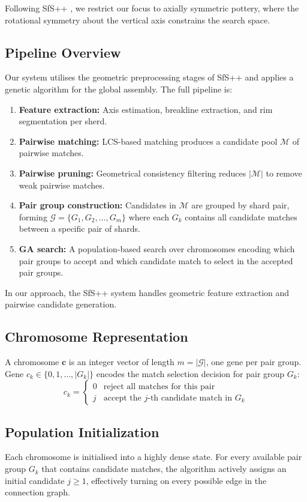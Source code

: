 \documentclass[conference]{IEEEtran}
\begin{document}
Following SfS++ \cite{b2}, we restrict our focus to axially symmetric pottery, where the rotational symmetry about the vertical axis constrains the search space.

\subsection{Pipeline Overview}
Our system utilises the geometric preprocessing stages of SfS++ and applies a genetic algorithm for the global assembly. The full pipeline is:
\begin{enumerate}
\item \textbf{Feature extraction:} Axis estimation, breakline extraction, and rim segmentation per sherd.
\item \textbf{Pairwise matching:} LCS-based matching produces a candidate pool $\mathcal{M}$ of pairwise matches.
\item \textbf{Pairwise pruning:} Geometrical consistency filtering reduces $|\mathcal{M}|$ to remove weak pairwise matches.
\item \textbf{Pair group construction:} Candidates in $\mathcal{M}$ are grouped by shard pair, forming $\mathcal{G} = \{G_1, G_2, \ldots, G_m\}$ where each $G_k$ contains all candidate matches between a specific pair of shards.
\item \textbf{GA search:} A population-based search over chromosomes encoding which pair groups to accept and which candidate match to select in the accepted pair groups.
\end{enumerate}
In our approach, the SfS++ system handles geometric feature extraction and pairwise candidate generation.

\subsection{Chromosome Representation}
A chromosome $\mathbf{c}$ is an integer vector of length $m = |\mathcal{G}|$, one gene per pair group. Gene $c_k \in \{0, 1, \ldots, |G_k|\}$ encodes the match selection decision for pair group $G_k$:
\begin{equation}
c_k =
\begin{cases}
0 & \text{reject all matches for this pair} \\
j & \text{accept the } j\text{-th candidate match in } G_k
\end{cases}
\end{equation}

\subsection{Population Initialization}
Each chromosome is initialised into a highly dense state. For every available pair group $G_k$ that contains candidate matches, the algorithm actively assigns an initial candidate $j \ge 1$, effectively turning on every possible edge in the connection graph.
\end{document}
